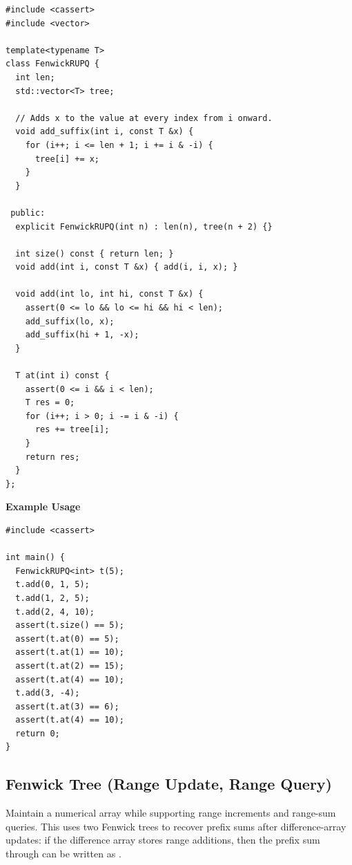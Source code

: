 \begin{lstlisting}[style=cpp]
#include <cassert>
#include <vector>

template<typename T>
class FenwickRUPQ {
  int len;
  std::vector<T> tree;

  // Adds x to the value at every index from i onward.
  void add_suffix(int i, const T &x) {
    for (i++; i <= len + 1; i += i & -i) {
      tree[i] += x;
    }
  }

 public:
  explicit FenwickRUPQ(int n) : len(n), tree(n + 2) {}

  int size() const { return len; }
  void add(int i, const T &x) { add(i, i, x); }

  void add(int lo, int hi, const T &x) {
    assert(0 <= lo && lo <= hi && hi < len);
    add_suffix(lo, x);
    add_suffix(hi + 1, -x);
  }

  T at(int i) const {
    assert(0 <= i && i < len);
    T res = 0;
    for (i++; i > 0; i -= i & -i) {
      res += tree[i];
    }
    return res;
  }
};
\end{lstlisting}
\textbf{Example Usage}\par
\begin{lstlisting}[style=cpp]
#include <cassert>

int main() {
  FenwickRUPQ<int> t(5);
  t.add(0, 1, 5);
  t.add(1, 2, 5);
  t.add(2, 4, 10);
  assert(t.size() == 5);
  assert(t.at(0) == 5);
  assert(t.at(1) == 10);
  assert(t.at(2) == 15);
  assert(t.at(4) == 10);
  t.add(3, -4);
  assert(t.at(3) == 6);
  assert(t.at(4) == 10);
  return 0;
}
\end{lstlisting}
\subsection{Fenwick Tree (Range Update, Range Query)}
\label{sec:2.7.3}
Maintain a numerical array while supporting range increments and range-sum queries. This uses two Fenwick trees to recover prefix sums after difference-array updates: if the difference array stores range additions, then the prefix sum through  can be written as .

